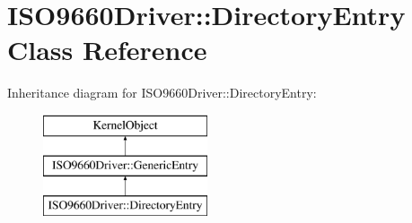 \hypertarget{class_i_s_o9660_driver_1_1_directory_entry}{}\section{I\+S\+O9660\+Driver\+:\+:Directory\+Entry Class Reference}
\label{class_i_s_o9660_driver_1_1_directory_entry}
Inheritance diagram for I\+S\+O9660\+Driver\+:\+:Directory\+Entry\+:\begin{figure}[H]
\begin{center}
\leavevmode
\includegraphics[height=3.000000cm]{class_i_s_o9660_driver_1_1_directory_entry}
\end{center}
\end{figure}
